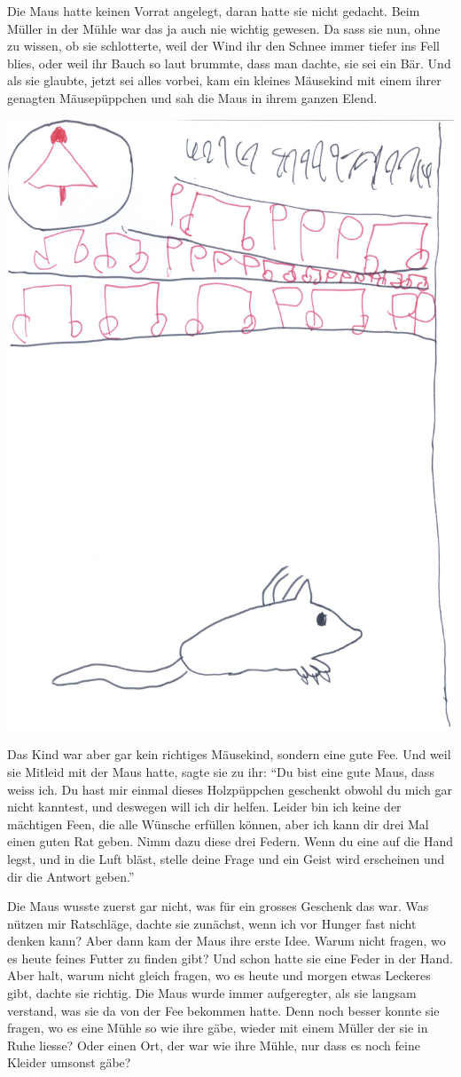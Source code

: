 Die Maus hatte keinen Vorrat angelegt, daran hatte sie nicht gedacht. Beim Müller in der Mühle war das ja auch nie wichtig gewesen. Da sass sie nun, ohne zu wissen, ob sie schlotterte, weil der Wind ihr den Schnee immer tiefer ins Fell blies, oder weil ihr Bauch so laut brummte, dass man dachte, sie sei ein Bär. Und als sie glaubte, jetzt sei alles vorbei, kam ein kleines Mäusekind mit einem ihrer genagten Mäusepüppchen und sah die Maus in ihrem ganzen Elend.

\begin{floatingfigure}{6cm}
    \includegraphics[width=.5\textwidth]{bilder/maus_2.jpg}
\end{floatingfigure}

Das Kind war aber gar kein richtiges Mäusekind, sondern eine gute Fee. Und weil sie Mitleid mit der Maus hatte, sagte sie zu ihr: \enquote{Du bist eine gute Maus, dass weiss ich. Du hast mir einmal dieses Holzpüppchen geschenkt obwohl du mich gar nicht kanntest, und deswegen will ich dir helfen. Leider bin ich keine der mächtigen Feen, die alle Wünsche erfüllen können, aber ich kann dir drei Mal einen guten Rat geben. Nimm dazu diese drei Federn. Wenn du eine auf die Hand legst, und in die Luft bläst, stelle deine Frage und ein Geist wird erscheinen und dir die Antwort geben.}

Die Maus wusste zuerst gar nicht, was für ein grosses Geschenk das war. Was nützen mir Ratschläge, dachte sie zunächst, wenn ich vor Hunger fast nicht denken kann? Aber dann kam der Maus ihre erste Idee. Warum nicht fragen, wo es heute feines Futter zu finden gibt? Und schon hatte sie eine Feder in der Hand. Aber halt, warum nicht gleich fragen, wo es heute und morgen etwas Leckeres gibt, dachte sie richtig. Die Maus wurde immer aufgeregter, als sie langsam verstand, was sie da von der Fee bekommen hatte. Denn noch besser konnte sie fragen, wo es eine Mühle so wie ihre gäbe, wieder mit einem Müller der sie in Ruhe liesse? Oder einen Ort, der war wie ihre Mühle, nur dass es noch feine Kleider umsonst gäbe?

